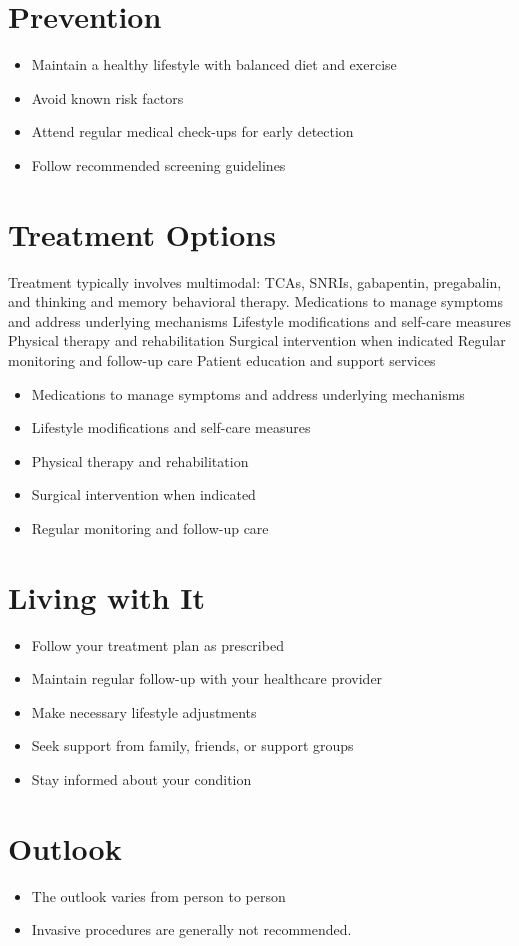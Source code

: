 \section{Prevention}
\begin{itemize}[noitemsep]
  \item Maintain a healthy lifestyle with balanced diet and exercise
  \item Avoid known risk factors
  \item Attend regular medical check-ups for early detection
  \item Follow recommended screening guidelines
\end{itemize}
\section{Treatment Options}
Treatment typically involves multimodal: TCAs, SNRIs, gabapentin, pregabalin, and thinking and memory behavioral therapy. Medications to manage symptoms and address underlying mechanisms Lifestyle modifications and self-care measures Physical therapy and rehabilitation Surgical intervention when indicated Regular monitoring and follow-up care Patient education and support services

\begin{itemize}[noitemsep]
  \item Medications to manage symptoms and address underlying mechanisms
  \item Lifestyle modifications and self-care measures
  \item Physical therapy and rehabilitation
  \item Surgical intervention when indicated
  \item Regular monitoring and follow-up care
\end{itemize}
\section{Living with It}
\begin{itemize}[noitemsep]
  \item Follow your treatment plan as prescribed
  \item Maintain regular follow-up with your healthcare provider
  \item Make necessary lifestyle adjustments
  \item Seek support from family, friends, or support groups
  \item Stay informed about your condition
\end{itemize}
\section{Outlook}
\begin{itemize}[noitemsep]
  \item The outlook varies from person to person
  \item Invasive procedures are generally not recommended.
\end{itemize}
